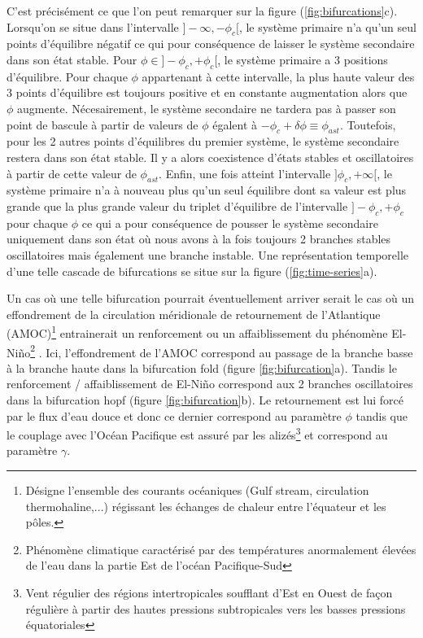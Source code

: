 C'est précisément ce que l'on peut remarquer sur la figure (\ref{fig:bifurcations}c). Lorsqu'on se situe dans l'intervalle $]-\infty, -\phi_c[$, le système primaire n'a qu'un seul points d'équilibre négatif ce qui pour conséquence de laisser le système secondaire dans son état stable. Pour $\phi \in ]-\phi_c, +\phi_c[$, le système primaire a 3 positions d'équilibre. Pour chaque $\phi$ appartenant à cette intervalle, la plus haute valeur des 3 points d'équilibre est toujours positive et en constante augmentation alors que $\phi$ augmente. Nécesairement, le système secondaire ne tardera pas à passer son point de bascule à partir de valeurs de $\phi$ égalent à $-\phi_c + \delta \phi \equiv \phi_{ast}$. Toutefois, pour les 2 autres points d'équilibres du premier système, le système secondaire restera dans son état stable. Il y a alors coexistence d'états stables et oscillatoires à partir de cette valeur de $\phi_{ast}$. Enfin, une fois atteint l'intervalle $]\phi_c, +\infty[$, le système primaire n'a à nouveau plus qu'un seul équilibre dont sa valeur est plus grande que la plus grande valeur du triplet d'équilibre de l'intervalle $]-\phi_c, +\phi_c$ pour chaque $\phi$ ce qui a pour conséquence de pousser le système secondaire uniquement dans son état où nous avons à la fois toujours 2 branches stables oscillatoires mais également une branche instable. Une représentation temporelle d'une telle cascade de bifurcations se situe sur la figure (\ref{fig:time-series}a).

Un cas où une telle bifurcation pourrait éventuellement arriver serait le cas où un effondrement de la circulation méridionale de retournement de l'Atlantique (AMOC)\footnote{Désigne l'ensemble des courants océaniques (Gulf stream, circulation thermohaline,...) régissant les échanges de chaleur entre l'équateur et les pôles.} entrainerait un renforcement ou un affaiblissement du phénomène El-Niño\footnote{Phénomène climatique caractérisé par des températures anormalement élevées de l'eau dans la partie Est de l'océan Pacifique-Sud} \cite{timmermann_influence_2007}. Ici, l'effondrement de l'AMOC correspond au passage de la branche basse à la branche haute dans la bifurcation fold (figure \ref{fig:bifurcation}a). Tandis le renforcement / affaiblissement de El-Niño correspond aux 2 branches oscillatoires dans la bifurcation hopf (figure \ref{fig:bifurcation}b). Le retournement est lui forcé par le flux d'eau douce et donc ce dernier correspond au paramètre $\phi$ tandis que le couplage avec l'Océan Pacifique est assuré par les alizés\footnote{Vent régulier des régions intertropicales soufflant d'Est en Ouest de façon régulière à partir des hautes pressions subtropicales vers les basses pressions équatoriales} et correspond au paramètre $\gamma$.

